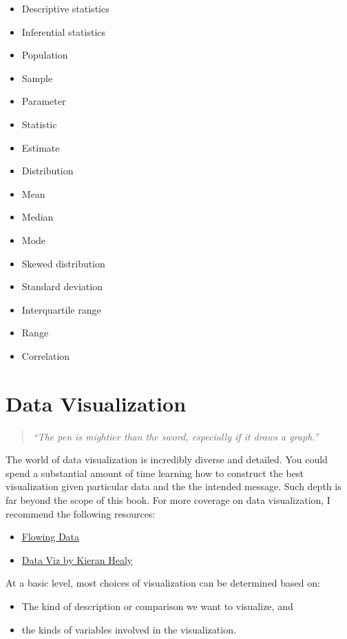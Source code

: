 \documentclass[
]{book}
\providecommand{\tightlist}{%
  \setlength{\itemsep}{0pt}\setlength{\parskip}{0pt}}
\begin{document}
\begin{itemize}
\tightlist
\item
  Descriptive statistics
\item
  Inferential statistics
\item
  Population
\item
  Sample
\item
  Parameter
\item
  Statistic
\item
  Estimate
\item
  Distribution
\item
  Mean
\item
  Median
\item
  Mode
\item
  Skewed distribution
\item
  Standard deviation
\item
  Interquartile range
\item
  Range
\item
  Correlation
\end{itemize}

\hypertarget{data-visualization}{%
\chapter{Data Visualization}\label{data-visualization}}

\begin{quote}
\emph{``The pen is mightier than the sword, especially if it draws a graph.''}
\end{quote}

The world of data visualization is incredibly diverse and detailed. You could spend a substantial amount of time learning how to construct the best visualization given particular data and the the intended message. Such depth is far beyond the scope of this book. For more coverage on data visualization, I recommend the following resources:

\begin{itemize}
\tightlist
\item
  \href{https://flowingdata.com}{Flowing Data}
\item
  \href{https://socviz.co/index.html\#preface}{Data Viz by Kieran Healy}
\end{itemize}

At a basic level, most choices of visualization can be determined based on:

\begin{itemize}
\tightlist
\item
  The kind of description or comparison we want to visualize, and
\item
  the kinds of variables involved in the visualization.
\end{itemize}
\end{document}
